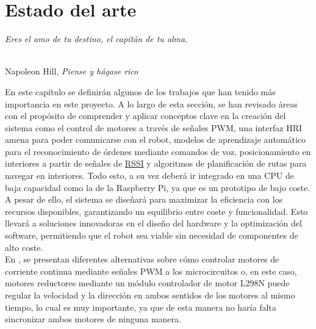 \chapter{Estado del arte}
\label{cap:capitulo2}
\setcounter{page}{1}

\begin{flushright}
\begin{minipage}[]{10cm}
\emph{Eres el amo de tu destino, el capitán de tu alma.}\\
\end{minipage}\\

Napoleon Hill, \textit{Piense y hágase rico}\\
\end{flushright}

\vspace{1cm}



En este capítulo se definirán algunos de los trabajos que han tenido más importancia en este proyecto. A lo largo de esta sección, se han revisado áreas con el propósito de comprender y aplicar conceptos clave en la creación del sistema como el control de motores a través de señales PWM, una interfaz HRI amena para poder comunicarse con el robot, modelos de aprendizaje automático para el reconocimiento de órdenes mediante comandos de voz, posicionamiento en interiores a partir de señales de \hyperlink{RSSI}{RSSI} y algoritmos de planificación de rutas para navegar en interiores. Todo esto, a su vez deberá ir integrado en una CPU de baja capacidad como la de la Raspberry Pi, ya que es un prototipo de bajo coste.\\

A pesar de ello, el sistema se diseñará para maximizar la eficiencia con los recursos disponibles, garantizando un equilibrio entre coste y funcionalidad. Esto llevará a soluciones innovadoras en el diseño del hardware y la optimización del software, permitiendo que el robot sea viable sin necesidad de componentes de alto coste.\\

En \cite{9815716}, se presentan diferentes alternativas sobre cómo controlar motores de corriente continua mediante señales PWM a los microcircuitos o, en este caso, motores reductores mediante un módulo controlador de motor L298N puede regular la velocidad y la dirección en ambos sentidos de los motores al mismo tiempo, lo cual es muy importante, ya que de esta manera no haría falta sincronizar ambos motores de ninguna manera.\\

